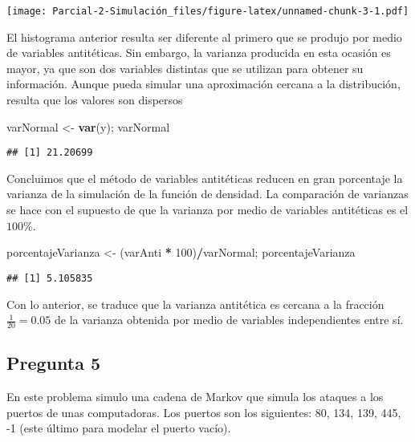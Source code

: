 \documentclass[
]{article}
\newenvironment{Shaded}{\begin{snugshade}}{\end{snugshade}}
\newcommand{\DecValTok}[1]{\textcolor[rgb]{0.00,0.00,0.81}{#1}}
\newcommand{\KeywordTok}[1]{\textcolor[rgb]{0.13,0.29,0.53}{\textbf{#1}}}
\newcommand{\NormalTok}[1]{#1}
\newcommand{\OperatorTok}[1]{\textcolor[rgb]{0.81,0.36,0.00}{\textbf{#1}}}
\newcommand{\StringTok}[1]{\textcolor[rgb]{0.31,0.60,0.02}{#1}}
\begin{document}
\texttt{[image: Parcial-2-Simulación\_files/figure-latex/unnamed-chunk-3-1.pdf]}

El histograma anterior resulta ser diferente al primero que se produjo
por medio de variables antitéticas. Sin embargo, la varianza producida
en esta ocasión es mayor, ya que son dos variables distintas que se
utilizan para obtener su información. Aunque pueda simular una
aproximación cercana a la distribución, resulta que los valores son
dispersos

\begin{Shaded}
\begin{Highlighting}[]
\NormalTok{varNormal <-}\StringTok{ }\KeywordTok{var}\NormalTok{(y);}
\NormalTok{varNormal}
\end{Highlighting}
\end{Shaded}

\begin{verbatim}
## [1] 21.20699
\end{verbatim}

Concluimos que el método de variables antitéticas reducen en gran
porcentaje la varianza de la simulación de la función de densidad. La
comparación de varianzas se hace con el supuesto de que la varianza por
medio de variables antitéticas es el \(100\)\%.

\begin{Shaded}
\begin{Highlighting}[]
\NormalTok{porcentajeVarianza <-}\StringTok{ }\NormalTok{(varAnti }\OperatorTok{*}\StringTok{ }\DecValTok{100}\NormalTok{)}\OperatorTok{/}\NormalTok{varNormal;}
\NormalTok{porcentajeVarianza}
\end{Highlighting}
\end{Shaded}

\begin{verbatim}
## [1] 5.105835
\end{verbatim}

Con lo anterior, se traduce que la varianza antitética es cercana a la
fracción \(\frac{1}{20}=0.05\) de la varianza obtenida por medio de
variables independientes entre sí.

\hypertarget{pregunta-5}{%
\subsection{Pregunta 5}\label{pregunta-5}}

En este problema simulo una cadena de Markov que simula los ataques a
los puertos de unas computadoras. Los puertos son los siguientes: 80,
134, 139, 445, -1 (este último para modelar el puerto vacío).
\end{document}
